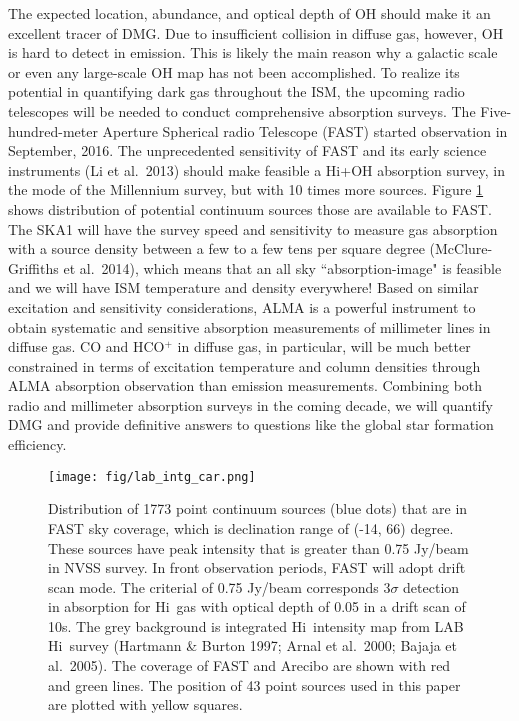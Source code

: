 \documentclass[preprint]{emulateapj}
\def\hi{H{\sc i}}
\begin{document}
The expected location, abundance, and optical depth of OH should make it 
an excellent tracer of DMG. Due to insufficient collision in diffuse gas, however, OH is hard to
detect in emission. This is likely the main reason why a galactic scale or even any large-scale OH map has not 
been accomplished. To realize its potential in quantifying dark gas throughout the ISM, the upcoming radio telescopes 
will be needed to conduct comprehensive absorption surveys. The Five-hundred-meter Aperture Spherical radio Telescope (FAST)
started observation in September, 2016. The unprecedented sensitivity of FAST and its early science instruments (Li et al.\ 2013) 
should make feasible a \hi+OH absorption survey, in the mode of the Millennium survey, but with 10 times more sources. Figure \ref{fig:fast_survey} shows distribution of  potential continuum sources those are available to FAST.  The SKA1 will have the survey speed and sensitivity to measure gas absorption with a source density between a few to a few tens per square degree (McClure-Griffiths et al.\ 2014), which means that an all sky ``absorption-image" is feasible and we will have ISM temperature and density  everywhere! Based on similar excitation  and sensitivity considerations,  ALMA is a powerful instrument to obtain systematic and sensitive absorption measurements of millimeter lines in diffuse gas. CO and HCO$^+$ in diffuse gas, in particular, will be much better constrained in terms of excitation temperature and column densities through ALMA absorption observation than emission measurements. Combining both radio and millimeter absorption surveys in the coming decade, we will quantify DMG and provide definitive answers to questions like the global star formation efficiency. 

\begin{figure}
\texttt{[image: fig/lab\_intg\_car.png]}
\caption{Distribution of 1773 point continuum sources (blue dots) that are in FAST sky coverage, which is declination range of (-14, 66) degree.  These sources have peak intensity that is greater than 0.75 Jy/beam in NVSS survey. In front observation periods, FAST will adopt drift scan mode. The criterial of 0.75 Jy/beam corresponds 3$\sigma$ detection in absorption for \hi\ gas with optical depth of 0.05 in a drift scan of 10s.  The grey background is integrated \hi\ intensity map from LAB \hi\ survey (Hartmann \& Burton 1997; Arnal et al.\ 2000; Bajaja et al.\ 2005). The coverage of FAST and Arecibo are shown with red and green lines.  The position of 43 point sources used in this paper are plotted with yellow squares. }
\label{fig:fast_survey}
\end{figure}
\end{document}
